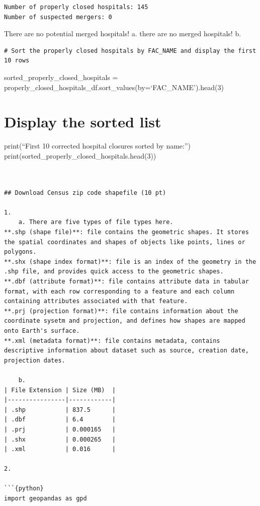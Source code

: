 \documentclass[
  letterpaper,
  DIV=11,
  numbers=noendperiod]{scrartcl}
\begin{document}
\begin{verbatim}
Number of properly closed hospitals: 145
Number of suspected mergers: 0
\end{verbatim}

There are no potential merged hospitals! a. there are no merged
hospitals! b.

\begin{verbatim}
# Sort the properly closed hospitals by FAC_NAME and display the first 10 rows
\end{verbatim}

sorted\_properly\_closed\_hospitals =
properly\_closed\_hospitals\_df.sort\_values(by=`FAC\_NAME').head(3)

\section{Display the sorted list}\label{display-the-sorted-list}

print(``First 10 corrected hospital closures sorted by name:'')
print(sorted\_properly\_closed\_hospitals.head(3))

\begin{verbatim}


## Download Census zip code shapefile (10 pt) 

1. 
    a. There are five types of file types here. 
**.shp (shape file)**: file contains the geometric shapes. It stores the spatial coordinates and shapes of objects like points, lines or polygons. 
**.shx (shape index format)**: file is an index of the geometry in the .shp file, and provides quick access to the geometric shapes. 
**.dbf (attribute format)**: file contains attribute data in tabular format, with each row corresponding to a feature and each column containing attributes associated with that feature. 
**.prj (projection format)**: file contains information about the coordinate sysetm and projection, and defines how shapes are mapped onto Earth's surface. 
**.xml (metadata format)**: file contains metadata, contains descriptive information about dataset such as source, creation date, projection dates. 

    b. 
| File Extension | Size (MB)  |
|----------------|------------|
| .shp           | 837.5      |
| .dbf           | 6.4        |
| .prj           | 0.000165   |
| .shx           | 0.000265   |
| .xml           | 0.016      |

2. 

```{python}
import geopandas as gpd
\end{verbatim}
\end{document}
